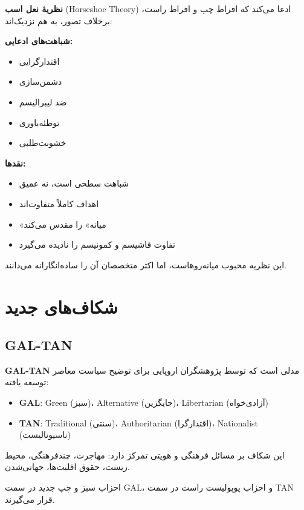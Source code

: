 \textbf{نظریهٔ نعل اسب} (Horseshoe Theory) ادعا می‌کند که افراط چپ و افراط راست، برخلاف تصور، به هم نزدیک‌اند:

\textbf{شباهت‌های ادعایی:}
\begin{itemize}
    \item اقتدارگرایی
    \item دشمن‌سازی
    \item ضد لیبرالیسم
    \item توطئه‌باوری
    \item خشونت‌طلبی
\end{itemize}

\textbf{نقدها:}
\begin{itemize}
    \item شباهت سطحی است، نه عمیق
    \item اهداف کاملاً متفاوت‌اند
    \item «میانه» را مقدس می‌کند
    \item تفاوت فاشیسم و کمونیسم را نادیده می‌گیرد
\end{itemize}

این نظریه محبوب میانه‌روهاست، اما اکثر متخصصان آن را ساده‌انگارانه می‌دانند.


\section{شکاف‌های جدید}

\subsection{GAL-TAN}

\begin{tcolorbox}[
    enhanced,
    colback=rightblue!8,
    colframe=rightblue,
    boxrule=1.5pt,
    arc=5pt,
    fonttitle=\bfseries,
    title={\rl{🔵 مفهوم کلیدی: شکاف GAL-TAN}}
]
\textbf{GAL-TAN} مدلی است که توسط پژوهشگران اروپایی برای توضیح سیاست معاصر توسعه یافته:

\begin{itemize}
    \item \textbf{GAL}: Green (سبز)، Alternative (جایگزین)، Libertarian (آزادی‌خواه)
    \item \textbf{TAN}: Traditional (سنتی)، Authoritarian (اقتدارگرا)، Nationalist (ناسیونالیست)
\end{itemize}

این شکاف بر مسائل فرهنگی و هویتی تمرکز دارد: مهاجرت، چندفرهنگی، محیط زیست، حقوق اقلیت‌ها، جهانی‌شدن.

احزاب سبز و چپ جدید در سمت GAL، و احزاب پوپولیست راست در سمت TAN قرار می‌گیرند.
\end{tcolorbox}

